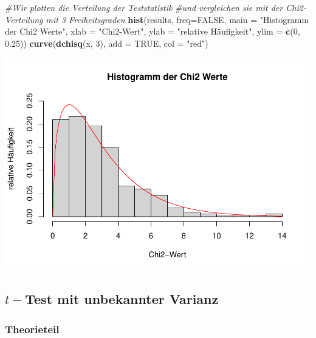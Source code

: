 \documentclass[]{article}
\newenvironment{Shaded}{\begin{snugshade}}{\end{snugshade}}
\newcommand{\CommentTok}[1]{\textcolor[rgb]{0.56,0.35,0.01}{\textit{#1}}}
\newcommand{\DataTypeTok}[1]{\textcolor[rgb]{0.13,0.29,0.53}{#1}}
\newcommand{\DecValTok}[1]{\textcolor[rgb]{0.00,0.00,0.81}{#1}}
\newcommand{\FloatTok}[1]{\textcolor[rgb]{0.00,0.00,0.81}{#1}}
\newcommand{\KeywordTok}[1]{\textcolor[rgb]{0.13,0.29,0.53}{\textbf{#1}}}
\newcommand{\NormalTok}[1]{#1}
\newcommand{\OtherTok}[1]{\textcolor[rgb]{0.56,0.35,0.01}{#1}}
\newcommand{\StringTok}[1]{\textcolor[rgb]{0.31,0.60,0.02}{#1}}
\begin{document}
\begin{Shaded}
\begin{Highlighting}[]
\CommentTok{#Wir plotten die Verteilung der Teststatistik }
\CommentTok{#und vergleichen sie mit der Chi2-Verteilung mit 3 Freiheitsgraden}
\KeywordTok{hist}\NormalTok{(results, }\DataTypeTok{freq=}\OtherTok{FALSE}\NormalTok{, }\DataTypeTok{main =} \StringTok{"Histogramm der Chi2 Werte"}\NormalTok{, }\DataTypeTok{xlab =} \StringTok{"Chi2-Wert"}\NormalTok{,}
     \DataTypeTok{ylab =} \StringTok{"relative Häufigkeit"}\NormalTok{, }\DataTypeTok{ylim =} \KeywordTok{c}\NormalTok{(}\DecValTok{0}\NormalTok{, }\FloatTok{0.25}\NormalTok{))}
\KeywordTok{curve}\NormalTok{(}\KeywordTok{dchisq}\NormalTok{(x, }\DecValTok{3}\NormalTok{), }\DataTypeTok{add =} \OtherTok{TRUE}\NormalTok{, }\DataTypeTok{col =} \StringTok{"red"}\NormalTok{)}
\end{Highlighting}
\end{Shaded}

\includegraphics{BelaSchinkeAusarbeitung_files/figure-latex/unnamed-chunk-3-1.pdf}

\hypertarget{t-test-mit-unbekannter-varianz}{%
\subsection{\texorpdfstring{\(t-\)Test mit unbekannter Varianz}{t-Test mit unbekannter Varianz}}\label{t-test-mit-unbekannter-varianz}}

\hypertarget{theorieteil-1}{%
\subsubsection{Theorieteil}\label{theorieteil-1}}
\end{document}
